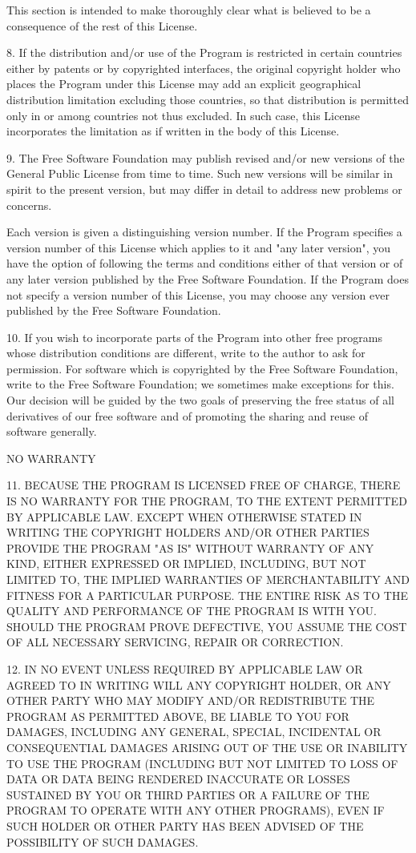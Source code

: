 \begin{small}
This section is intended to make thoroughly clear what is believed to be a
consequence of the rest of this License.

8. If the distribution and/or use of the Program is restricted in certain
countries either by patents or by copyrighted interfaces, the original
copyright holder who places the Program under this License may add an explicit
geographical distribution limitation excluding those countries, so that
distribution is permitted only in or among countries not thus excluded. In
such case, this License incorporates the limitation as if written in the body
of this License.

9. The Free Software Foundation may publish revised and/or new versions of the
General Public License from time to time. Such new versions will be similar in
spirit to the present version, but may differ in detail to address new
problems or concerns.

Each version is given a distinguishing version number. If the Program
specifies a version number of this License which applies to it and "any later
version", you have the option of following the terms and conditions either of
that version or of any later version published by the Free Software
Foundation. If the Program does not specify a version number of this License,
you may choose any version ever published by the Free Software Foundation.

10. If you wish to incorporate parts of the Program into other free programs
whose distribution conditions are different, write to the author to ask for
permission. For software which is copyrighted by the Free Software Foundation,
write to the Free Software Foundation; we sometimes make exceptions for this.
Our decision will be guided by the two goals of preserving the free status of
all derivatives of our free software and of promoting the sharing and reuse of
software generally.

NO WARRANTY

11. BECAUSE THE PROGRAM IS LICENSED FREE OF CHARGE, THERE IS NO WARRANTY FOR
THE PROGRAM, TO THE EXTENT PERMITTED BY APPLICABLE LAW. EXCEPT WHEN OTHERWISE
STATED IN WRITING THE COPYRIGHT HOLDERS AND/OR OTHER PARTIES PROVIDE THE
PROGRAM "AS IS" WITHOUT WARRANTY OF ANY KIND, EITHER EXPRESSED OR IMPLIED,
INCLUDING, BUT NOT LIMITED TO, THE IMPLIED WARRANTIES OF MERCHANTABILITY AND
FITNESS FOR A PARTICULAR PURPOSE. THE ENTIRE RISK AS TO THE QUALITY AND
PERFORMANCE OF THE PROGRAM IS WITH YOU. SHOULD THE PROGRAM PROVE DEFECTIVE,
YOU ASSUME THE COST OF ALL NECESSARY SERVICING, REPAIR OR CORRECTION.

12. IN NO EVENT UNLESS REQUIRED BY APPLICABLE LAW OR AGREED TO IN WRITING WILL
ANY COPYRIGHT HOLDER, OR ANY OTHER PARTY WHO MAY MODIFY AND/OR REDISTRIBUTE
THE PROGRAM AS PERMITTED ABOVE, BE LIABLE TO YOU FOR DAMAGES, INCLUDING ANY
GENERAL, SPECIAL, INCIDENTAL OR CONSEQUENTIAL DAMAGES ARISING OUT OF THE USE
OR INABILITY TO USE THE PROGRAM (INCLUDING BUT NOT LIMITED TO LOSS OF DATA OR
DATA BEING RENDERED INACCURATE OR LOSSES SUSTAINED BY YOU OR THIRD PARTIES OR
A FAILURE OF THE PROGRAM TO OPERATE WITH ANY OTHER PROGRAMS), EVEN IF SUCH
HOLDER OR OTHER PARTY HAS BEEN ADVISED OF THE POSSIBILITY OF SUCH DAMAGES. 
\end{small}

